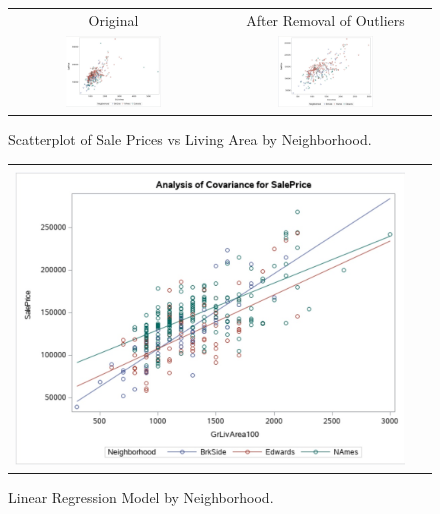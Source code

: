 \documentclass[11pt]{scrartcl} %
\begin{document}
\begin{figure}[H] %
	\centering
	\begin{tabular}{p{} p{}}
\hline	
	\multicolumn{1}{|c|}{Original} &  \multicolumn{1}{|c|}{After Removal of Outliers} \\
		\multicolumn{1}{|c|}{\includegraphics[width=0.48\textwidth]{../graphics/A1NHscat1}} &
		\multicolumn{1}{|c|}{\includegraphics[width=0.48\textwidth]{../graphics/A1NHscat2}}\\
		\hline
	\end{tabular}		
	\caption{Scatterplot of Sale Prices vs Living Area by Neighborhood.}
	\label{fig:NBscat}
\end{figure}
\begin{figure}[H] %
	\centering
	\begin{tabular}{| p{}|}
	\hline
	\\
	\includegraphics[width=0.95\textwidth]{../graphics/A1NBMLR}\\
	\hline
	\end{tabular}	
	\caption{Linear Regression Model by Neighborhood.}
	\label{fig:NBLRM}
\end{figure}
\end{document}
